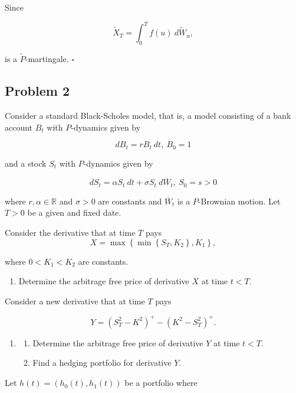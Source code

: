 \documentclass[
]{book}
\providecommand{\tightlist}{%
  \setlength{\itemsep}{0pt}\setlength{\parskip}{0pt}}
\begin{document}
Since

\[
\tilde{X}_T=\int_0^Tf(u)\ d\tilde{W}_u,
\]

is a \(\tilde{P}\)-martingale. \(\square\)

\noindent\makebox[\linewidth]{\rule{\textwidth}{0.4pt}}

\hypertarget{problem-2}{%
\subsection{Problem 2}\label{problem-2}}

Consider a standard Black-Scholes model, that is, a model consisting of a bank account \(B_t\) with \(P\)-dynamics given by

\[
dB_t=rB_t\ dt,\ B_0=1
\]

and a stock \(S_t\) with \(P\)-dynamics given by

\[
dS_t=\alpha S_t\ dt+\sigma S_t\ d\overline{W}_t,\ S_0=s>0
\]

where \(r,\alpha\in\mathbb{R}\) and \(\sigma >0\) are constants and \(\overline{W}_t\) is a \(P\)-Brownian motion. Let \(T>0\) be a given and fixed date.

Consider the derivative that at time \(T\) pays
\[
X=\max\left\{\min\left\{S_T,K_2\right\},K_1\right\},
\]

where \(0<K_1<K_2\) are constants.

\begin{enumerate}
\def\labelenumi{\alph{enumi}.}
\tightlist
\item
  Determine the arbitrage free price of derivative \(X\) at time \(t<T\).
\end{enumerate}

Consider a new derivative that at time \(T\) pays

\[
Y=(S^2_T-K^2)^+-(K^2-S^2_T)^+.
\]

\begin{enumerate}
\def\labelenumi{\alph{enumi}.}
\setcounter{enumi}{1}
\item
  \begin{enumerate}
  \def\labelenumii{\roman{enumii}.}
  \tightlist
  \item
    Determine the arbitrage free price of derivative \(Y\) at time \(t<T\).
  \item
    Find a hedging portfolio for derivative \(Y\).
  \end{enumerate}
\end{enumerate}

Let \(h(t)=(h_0(t),h_1(t))\) be a portfolio where
\end{document}
